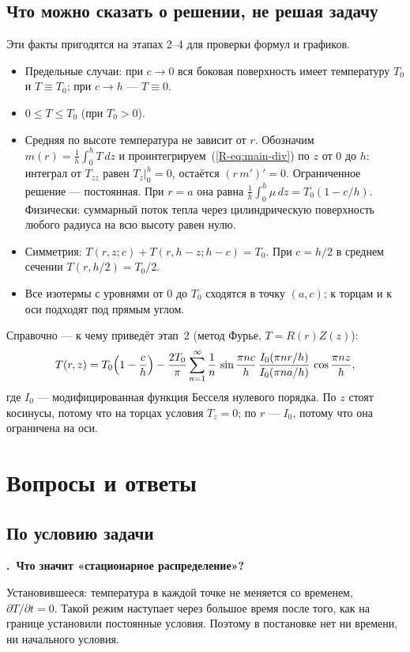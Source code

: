 \documentclass[a4paper,12pt]{article}
\renewcommand{\le}{\leqslant}
\newcommand{\rf}[1]{(\ref*{R-#1})}
\newcounter{qa}
\newcommand{\q}[1]{\par\medskip\refstepcounter{qa}%
  \textbf{\theqa.~#1}\par\nopagebreak[4]}
\begin{document}
\subsection{Что можно сказать о решении, не решая задачу}
\label{der:checks}
Эти факты пригодятся на этапах 2–4 для проверки формул и графиков.
\begin{itemize}
  \item Предельные случаи: при $c\to0$ вся боковая поверхность имеет
  температуру $T_0$ и $T\equiv T_0$; при $c\to h$ — $T\equiv0$.
  \item $0\le T\le T_0$ (при $T_0>0$).
  \item Средняя по высоте температура не зависит от $r$. Обозначим
  $m(r)=\frac1h\int_0^h T\,dz$ и проинтегрируем~\rf{eq:main-div} по $z$ от
  0 до $h$: интеграл от $T_{zz}$ равен $T_z|_0^h=0$, остаётся
  $(r\,m')'=0$. Ограниченное решение — постоянная. При $r=a$ она равна
  $\frac1h\int_0^h\mu\,dz=T_0(1-c/h)$. Физически: суммарный поток тепла
  через цилиндрическую поверхность любого радиуса на всю высоту равен нулю.
  \item Симметрия: $T(r,z;c)+T(r,h-z;h-c)=T_0$. При $c=h/2$ в среднем
  сечении $T(r,h/2)=T_0/2$.
  \item Все изотермы с уровнями от 0 до $T_0$ сходятся в точку $(a,c)$;
  к торцам и к оси подходят под прямым углом.
\end{itemize}
Справочно — к чему приведёт этап~2 (метод Фурье, $T=R(r)Z(z)$):
\[
T(r,z)=T_0\Bigl(1-\frac{c}{h}\Bigr)-\frac{2T_0}{\pi}\sum_{n=1}^{\infty}
\frac1n\,\sin\frac{\pi nc}{h}\,
\frac{I_0(\pi nr/h)}{I_0(\pi na/h)}\,\cos\frac{\pi nz}{h},
\]
где $I_0$ — модифицированная функция Бесселя нулевого порядка. По $z$ стоят
косинусы, потому что на торцах условия $T_z=0$; по $r$ — $I_0$, потому что
она ограничена на оси.

\section{Вопросы и ответы}
\label{sec:qa}

\subsection{По условию задачи}

\q{Что значит «стационарное распределение»?}
Установившееся: температура в каждой точке не меняется со временем,
$\partial T/\partial t=0$. Такой режим наступает через большое время после
того, как на границе установили постоянные условия. Поэтому в постановке нет
ни времени, ни начального условия.
\end{document}
